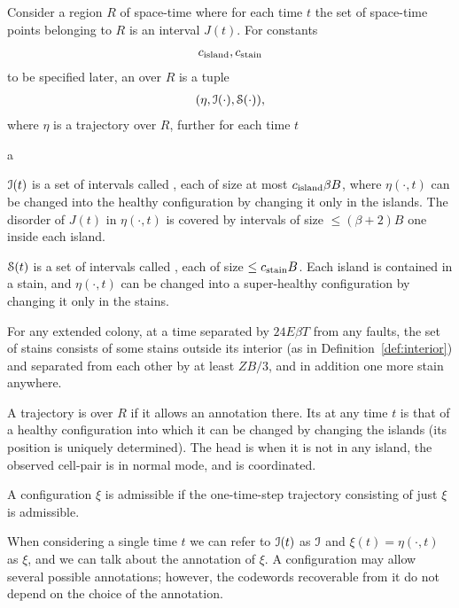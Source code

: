 \documentclass[11pt]{memoir}
\theoremstyle{definition} %
\renewcommand{\le}{\leq}
\newcommand{\fld}[1]{\ensuremath{\textit{#1\/}}}
\def\B{B}
\newcommand{\E}{E} %
\newcommand{\Q}{Q} %
\newcommand{\Tu}{T}
\newcommand{\Z}{Z} %
\newcommand{\Turned}{\fld{Turned}} %
\newcommand{\cns}[1]{c_{\textrm{\upshape #1}}}
\begin{document}
\begin{definition}[Annotation]\label{def:annotation}
  Consider a region \( R \) of space-time where for each time \( t \) the set of space-time points
  belonging to \( R \) is an interval \( J(t) \).  
  For constants
\begin{align}\label{eq:stain}
   \cns{island}, \cns{stain} %
\end{align}
to be specified later, %
an  over \( R \) is a tuple
  \begin{align*}
    (\eta,\mathcal{I}(\cdot), \mathcal{S}(\cdot)),
  \end{align*}
  where \( \eta \) is a trajectory over \( R \), further for each time \( t \) 
  \begin{varenum}[series=annotated]{a}

  \item  \( \mathcal{I}(t) \) is a set of intervals called ,
    each of size at most \( \cns{island}\beta\B \),
    where \( \eta(\cdot,t) \) can be changed into the healthy
    configuration by changing it only in the islands.
    The disorder of \( J(t) \) in \( \eta(\cdot,t) \)
    is covered by intervals of size \( \le (\beta+2)\B \) one inside each island.
    
  \item \( \mathcal{S}(t) \) is a set of intervals called , each of size \( \le \cns{stain}\B \).
    Each island is contained in a stain, and
    \( \eta(\cdot,t) \) can be changed into a super-healthy
    configuration by changing it only in the stains.

  \item For any extended colony, at a time separated by \( 24\E\beta\Tu \) from any faults,
    the set of stains consists of some stains
    outside its interior (as in Definition~\ref{def:interior}) and
    separated from each other by at least \( \Z\B/3 \), and in addition one more stain anywhere.

  \end{varenum}
  A trajectory is  over \( R \) if it allows an annotation there.
  Its  at any time \( t \) is that of a healthy configuration into which it can
  be changed by changing the islands (its position is uniquely determined).
The head is  when it is not in any island,
the observed cell-pair is in normal mode, and is coordinated.

A configuration \( \xi \) is admissible if the one-time-step trajectory
consisting of just \( \xi \) is admissible.
\end{definition}
When considering a single time \( t \)
we can refer to \( \mathcal{I}(t) \) as \( \mathcal{I} \) and \( \xi(t)=\eta(\cdot,t) \) as \( \xi \),
and we can talk about the annotation of \( \xi \).
A configuration may allow several possible annotations;
however, the codewords recoverable from it do not depend on the choice of the
annotation.
\end{document}
